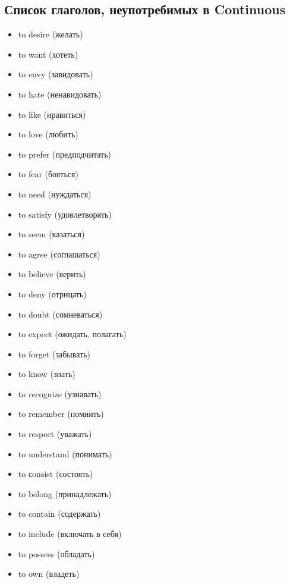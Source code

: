 \subsection{Список глаголов, неупотребимых в Continuous}
\begin{itemize}
    \item to desire (желать)
    \item to want (хотеть)
    \item to envy (завидовать)
    \item to hate (ненавидовать)
    \item to like (нравиться)
    \item to love (любить)
    \item to prefer (предподчитать)
    \item to fear (бояться)
    \item to need (нуждаться)
    \item to satisfy (удовлетворять)
    \item to seem (казаться)
    \item to agree (соглашаться)
    \item to believe (верить)
    \item to deny (отрицать)
    \item to doubt (сомневаться)
    \item to expect (ожидать, полагать)
    \item to forget (забывать)
    \item to know (знать)
    \item to recognize (узнавать)
    \item to remember (помнить)
    \item to respect (уважать)
    \item to understand (понимать)
    \item to сonsist (состоять)
    \item to belong (принадлежать)
    \item to contain (содержать)
    \item to include (включать в себя)
    \item to possess (обладать)
    \item to own (владеть)
\end{itemize}
